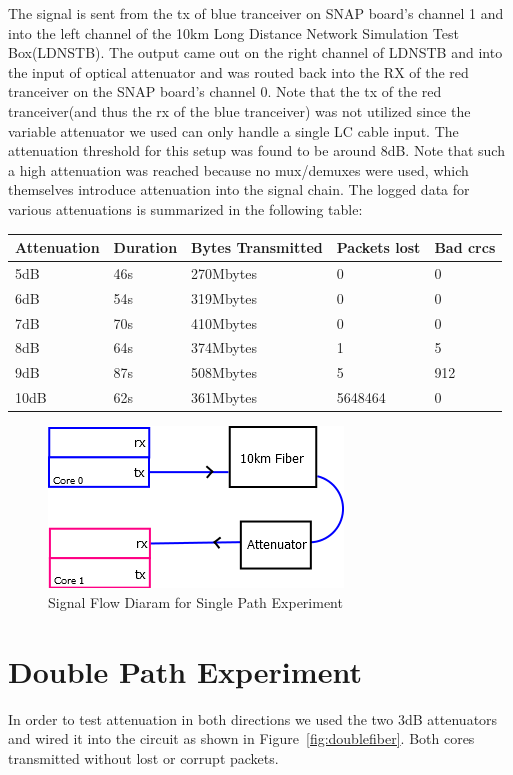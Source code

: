 \documentclass{article}
\begin{document}
The signal is sent from the tx of blue tranceiver on SNAP board's channel 1 and into the left channel of the 10km Long Distance Network Simulation Test Box(LDNSTB). The output came out on the right channel of LDNSTB and into the input of optical attenuator and was routed back into the RX of the red tranceiver on the SNAP board's channel 0. Note that the tx of the red tranceiver(and thus the rx of the blue tranceiver) was not utilized since the variable attenuator we used can only handle a single LC cable input. The attenuation threshold for this setup was found to be around 8dB. Note that such a high attenuation was reached because no mux/demuxes were used, which themselves introduce attenuation into the signal chain. 
The logged data for various attenuations is summarized in the following table:
\begin{center}
\begin{tabular}{|l|l|l|l|p{2cm}|}
	\hline
	Attenuation & Duration & Bytes Transmitted & Packets lost & Bad crcs \\ \hline
	5dB & 46s & 270Mbytes & 0 & 0 \\ \hline
	6dB & 54s & 319Mbytes & 0 & 0 \\ \hline
	7dB & 70s & 410Mbytes & 0 & 0 \\ \hline
	8dB & 64s & 374Mbytes & 1 & 5 \\ \hline
	9dB & 87s & 508Mbytes & 5 & 912 \\ \hline
	10dB & 62s & 361Mbytes & 5648464 & 0 \\ \hline 
	
\end{tabular}
\end{center}

\begin{figure}[h!]
	\centering
	\includegraphics[width = .6\linewidth]{singlepath080415.png}
	\caption{Signal Flow Diaram for Single Path Experiment}
\end{figure}


\section*{Double Path Experiment}
In order to test attenuation in both directions we used the two 3dB attenuators and wired it into the circuit as shown in Figure~\ref{fig:doublefiber}. Both cores transmitted without lost or corrupt packets. 
\end{document}
